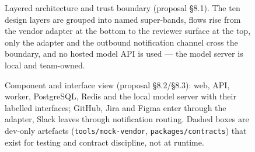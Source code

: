%
%
%     

\begin{landscape}
\begin{figure}[p]
  \centering
  \resizebox{\linewidth}{!}{}
  \caption{Layered architecture and trust boundary (proposal §8.1). The ten
           design layers are grouped into named super-bands, flows rise from
           the vendor adapter at the bottom to the reviewer surface at the
           top, only the adapter and the outbound notification channel cross
           the boundary, and no hosted model API is used — the model server
           is local and team-owned.}
  \label{fig:layered-arch}
\end{figure}
\end{landscape}

\begin{landscape}
\begin{figure}[p]
  \centering
  \resizebox{\linewidth}{!}{}
  \caption{Component and interface view (proposal §8.2/§8.3): web, API,
           worker, PostgreSQL, Redis and the local model server with their
           labelled interfaces; GitHub, Jira and Figma enter through the
           adapter, Slack leaves through notification routing. Dashed boxes
           are dev-only artefacts (\texttt{tools/mock-vendor},
           \texttt{packages/contracts}) that exist for testing and contract
           discipline, not at runtime.}
  \label{fig:components}
\end{figure}
\end{landscape}

